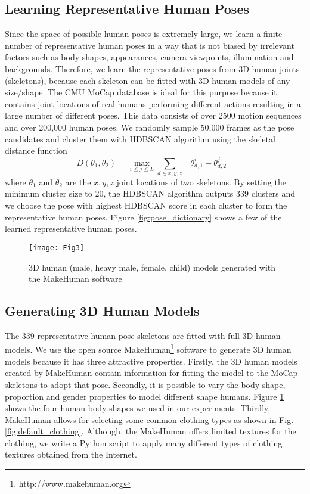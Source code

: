 \documentclass[twocolumn]{svjour3}          \smartqed  \usepackage{graphicx}
\begin{document}
\subsection{Learning Representative Human Poses}

Since the space of possible human poses is extremely large, we learn a finite number of representative human poses in a way that is not biased by irrelevant factors such as body shapes, appearances, camera viewpoints, illumination and backgrounds. Therefore, we learn the representative poses from 3D human joints (skeletons), because each skeleton can be fitted with 3D human models of any size/shape. The CMU MoCap database is ideal for this purpose because it contains joint locations of real humans performing different actions resulting in a large number of different poses. This data consists of over 2500 motion sequences and over 200,000 human poses. We randomly sample 50,000 frames as the pose candidates and cluster them with HDBSCAN algorithm \citep{mcinnes2017hdbscan} using the skeletal distance function \citep{shakhnarovich2005learning}  
\begin{equation}
D(\theta_1, \theta_2) = \max_{i \leq j \leq L} \sum_{d \in x,y,z} \mid \theta_{d,1}^i - \theta_{d,2}^j \mid
\label{eq:1}
\end{equation} 
where $\theta_1$ and $\theta_2$ are the $x,y,z$ joint locations of two skeletons. By setting the minimum cluster size to 20, the HDBSCAN algorithm outputs 339 clusters and we choose the pose with highest HDBSCAN score in each cluster to form the representative human poses. Figure \ref{fig:pose_dictionary} shows a few of the learned representative human poses.


\begin{figure}[t]
\centering
\texttt{[image: Fig3]}
\caption{3D human (male, heavy male, female, child) models generated with the MakeHuman software}
\label{fig:3D_humans}
\end{figure}

\vspace{-2mm}
\subsection{Generating 3D Human Models}
The 339 representative human pose skeletons are fitted with full 3D human models. We use the open source MakeHuman\footnote{http://www.makehuman.org} software to generate 3D human models because it has three attractive properties. Firstly, the 3D human models created by MakeHuman contain information for fitting the model to the MoCap skeletons to adopt that pose. Secondly, it is possible to vary the body shape, proportion and gender properties to model different shape humans. Figure \ref{fig:3D_humans} shows the four human body shapes we used in our experiments. Thirdly, MakeHuman allows for selecting some common clothing types as shown in Fig. \ref{fig:default_clothing}. Although, the MakeHuman offers limited textures for the clothing, we write a Python script to apply many different types of clothing textures obtained from the Internet.
\end{document}
